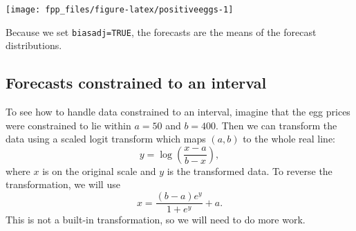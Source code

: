 \documentclass[]{book}
\begin{document}
\begin{center}\texttt{[image: fpp\_files/figure-latex/positiveeggs-1]} \end{center}

Because we set \texttt{biasadj=TRUE}, the forecasts are the means of the forecast distributions.

\hypertarget{forecasts-constrained-to-an-interval}{%
\subsection*{Forecasts constrained to an interval}\label{forecasts-constrained-to-an-interval}}

To see how to handle data constrained to an interval, imagine that the egg prices were constrained to lie within \(a=50\) and \(b=400\). Then we can transform the data using a scaled logit transform which maps \((a,b)\) to the whole real line:
\[
y = \log\left(\frac{x-a}{b-x}\right),
\]
where \(x\) is on the original scale and \(y\) is the transformed data. To reverse the transformation, we will use
\[
x  = \frac{(b-a)e^y}{1+e^y} + a.
\]
This is not a built-in transformation, so we will need to do more work.
\end{document}
